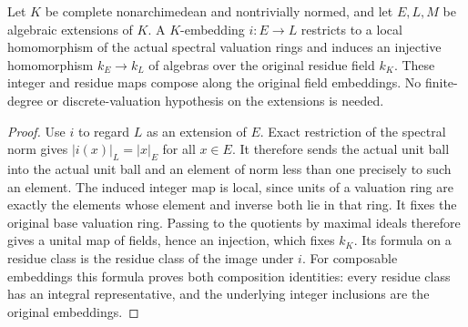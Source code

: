 \begin{lemma}
\label{fw:spectral-integer-residue-maps}
\leanok
Let $K$ be complete nonarchimedean and nontrivially normed, and let
$E,L,M$ be algebraic extensions of $K$. A $K$-embedding
$i:E\to L$ restricts to a local homomorphism of the actual
spectral valuation rings and induces an injective homomorphism
$k_E\to k_L$ of algebras over the original residue field $k_K$.
These integer and residue maps compose along the original field
embeddings. No finite-degree or discrete-valuation hypothesis on
the extensions is needed.
\end{lemma}
\begin{proof}
Use $i$ to regard $L$ as an extension of $E$. Exact restriction
of the spectral norm gives $|i(x)|_L=|x|_E$ for all $x\in E$.
It therefore sends the actual unit ball into the actual unit ball
and an element of norm less than one precisely to such an element.
The induced integer map is local, since units of a valuation ring
are exactly the elements whose element and inverse both lie in
that ring. It fixes the original base valuation ring. Passing to
the quotients by maximal ideals therefore gives a unital map of
fields, hence an injection, which fixes $k_K$. Its formula on
a residue class is the residue class of the image under $i$.
For composable embeddings this formula proves both composition
identities: every residue class has an integral representative,
and the underlying integer inclusions are the original embeddings.
\end{proof}

